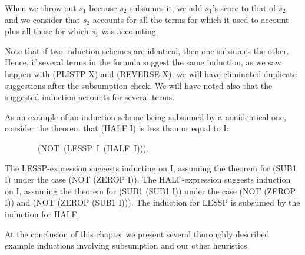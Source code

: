 \documentclass[10pt]{book}
\newenvironment{pubasis}{\begin{flushleft}}{\end{flushleft}}
\begin{document}
When we throw out $s_{1}$ because $s_{2}$ subsumes it, we add $s_{1}$'s score to that of
$s_{2}$, and we consider that $s_{2}$  accounts for
all the terms for which it used to account plus all those for which $s_{1}$ was  accounting.

Note that if two induction schemes are identical, then one subsumes
the other.  Hence, if several terms in the formula suggest the same
induction, as we saw happen with (PLISTP X) and (REVERSE X), we
will have eliminated duplicate suggestions after the subsumption check.
We will have  noted also that the suggested induction accounts for
several terms.

As an example of an induction scheme being subsumed by a nonidentical
one, consider the theorem that (HALF I) is less than or equal to I:
\begin{pubasis}
~~~~~~~~(NOT~(LESSP~I~(HALF~I))).\\
\end{pubasis}
The LESSP-expression suggests inducting on I, assuming the theorem for
(SUB1 I) under the case (NOT (ZEROP I)).  The HALF-expression suggests
induction on I, assuming the theorem for (SUB1 (SUB1 I)) under the
case (NOT (ZEROP I)) and (NOT (ZEROP (SUB1 I))).  The induction for LESSP
is subsumed by the induction for HALF.

At the conclusion of this chapter we present several thoroughly
described example inductions involving subsumption and our other heuristics.
\end{document}
